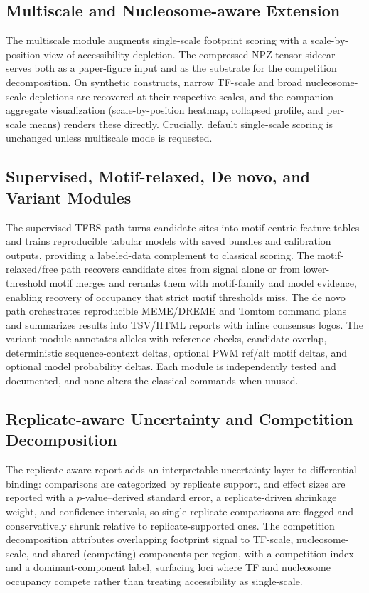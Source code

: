 \documentclass[biomedinformatics,article,submit,pdftex,moreauthors]{Definitions/mdpi}
\begin{document}
\subsection{Multiscale and Nucleosome-aware Extension}

The multiscale module augments single-scale footprint scoring with a
scale-by-position view of accessibility depletion. The compressed NPZ tensor
sidecar serves both as a paper-figure input and as the substrate for the
competition decomposition. On synthetic constructs, narrow TF-scale and broad
nucleosome-scale depletions are recovered at their respective scales, and the
companion aggregate visualization (scale-by-position heatmap, collapsed profile,
and per-scale means) renders these directly. Crucially, default single-scale
scoring is unchanged unless multiscale mode is requested.

\subsection{Supervised, Motif-relaxed, De novo, and Variant Modules}

The supervised TFBS path turns candidate sites into motif-centric feature tables
and trains reproducible tabular models with saved bundles and calibration
outputs, providing a labeled-data complement to classical scoring. The
motif-relaxed/free path recovers candidate sites from signal alone or from
lower-threshold motif merges and reranks them with motif-family and model
evidence, enabling recovery of occupancy that strict motif thresholds miss. The de
novo path orchestrates reproducible MEME/DREME and Tomtom command plans and
summarizes results into TSV/HTML reports with inline consensus logos. The variant
module annotates alleles with reference checks, candidate overlap, deterministic
sequence-context deltas, optional PWM ref/alt motif deltas, and optional model
probability deltas. Each module is independently tested and documented, and none
alters the classical commands when unused.

\subsection{Replicate-aware Uncertainty and Competition Decomposition}

The replicate-aware report adds an interpretable uncertainty layer to differential
binding: comparisons are categorized by replicate support, and effect sizes are
reported with a $p$-value--derived standard error, a replicate-driven shrinkage
weight, and confidence intervals, so single-replicate comparisons are flagged and
conservatively shrunk relative to replicate-supported ones. The competition
decomposition attributes overlapping footprint signal to TF-scale,
nucleosome-scale, and shared (competing) components per region, with a competition
index and a dominant-component label, surfacing loci where TF and nucleosome
occupancy compete rather than treating accessibility as single-scale.
\end{document}
